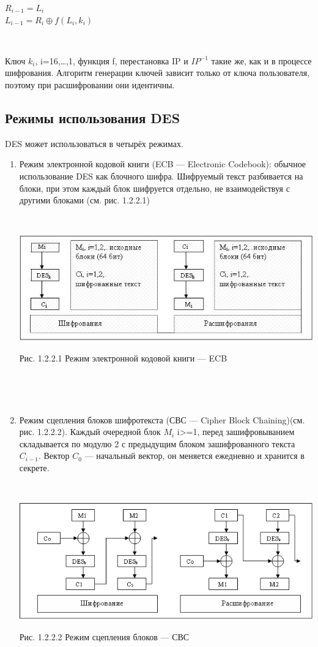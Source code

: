 \documentclass[a4paper]{report}
\begin{document}
$R_{i-1} = L_i$ \\
$L_{i-1} = R_i \oplus f(L_i,k_i)$

~

Ключ $k_{i}$, i=16,…,1, функция f, перестановка IP и $IP^{-1}$ такие же, как и в процессе шифрования. Алгоритм генерации ключей зависит только от ключа пользователя, поэтому при расшифровании они идентичны.


\subsection{Режимы использования DES}
DES может использоваться в четырёх режимах.

\begin{enumerate}
\item Режим электронной кодовой книги (ECB — Electronic Codebook): обычное использование DES как блочного шифра. Шифруемый текст разбивается на блоки, при этом каждый блок шифруется отдельно, не взаимодействуя с другими блоками (см. рис. 1.2.2.1)

~

\includegraphics[scale=1.2]{ECB1}
{\centering\caption{\newline Рис. 1.2.2.1 Режим электронной кодовой книги — ECB}\\}

~


\item Режим сцепления блоков шифротекста (СВС — Cipher Block Chaining)(см. рис. 1.2.2.2). Каждый очередной блок $M_{i}$ i>=1, перед зашифровыванием складывается по модулю 2 с предыдущим блоком зашифрованного текста $C_{i-1}$. Вектор $C_{0}$ — начальный вектор, он меняется ежедневно и хранится в секрете.

~

\includegraphics[scale=1.1]{CBC}
{\centering\caption{\newline Рис. 1.2.2.2 Режим сцепления блоков — СВС}\\}


\end{enumerate}
\end{document}
